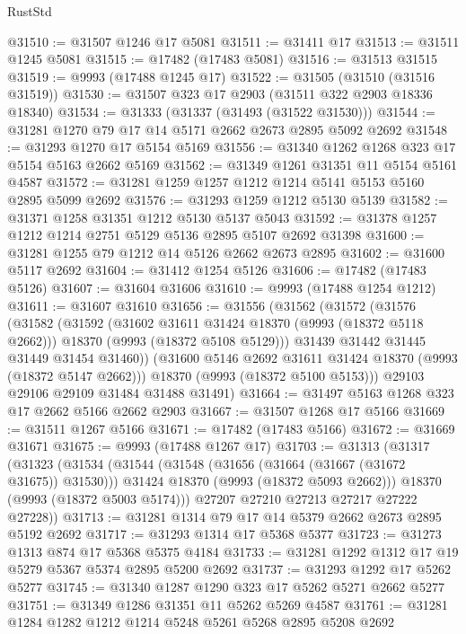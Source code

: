 \begin{lexlean}{RustStd}
\begin{coremodule}
@31510 := @31507 @1246 @17 @5081
@31511 := @31411 @17
@31513 := @31511 @1245 @5081
@31515 := @17482 (@17483 @5081)
@31516 := @31513 @31515
@31519 := @9993 (@17488 @1245 @17)
@31522 := @31505 (@31510 (@31516 @31519))
@31530 := @31507 @323 @17 @2903 (@31511 @322 @2903 @18336 @18340)
@31534 := @31333 (@31337 (@31493 (@31522 @31530)))
@31544 := @31281 @1270 @79 @17 @14 @5171 @2662 @2673 @2895 @5092 @2692
@31548 := @31293 @1270 @17 @5154 @5169
@31556 := @31340 @1262 @1268 @323 @17 @5154 @5163 @2662 @5169
@31562 := @31349 @1261 @31351 @11 @5154 @5161 @4587
@31572 := @31281 @1259 @1257 @1212 @1214 @5141 @5153 @5160 @2895 @5099 @2692
@31576 := @31293 @1259 @1212 @5130 @5139
@31582 := @31371 @1258 @31351 @1212 @5130 @5137 @5043
@31592 := @31378 @1257 @1212 @1214 @2751 @5129 @5136 @2895 @5107 @2692 @31398
@31600 := @31281 @1255 @79 @1212 @14 @5126 @2662 @2673 @2895
@31602 := @31600 @5117 @2692
@31604 := @31412 @1254 @5126
@31606 := @17482 (@17483 @5126)
@31607 := @31604 @31606
@31610 := @9993 (@17488 @1254 @1212)
@31611 := @31607 @31610
@31656 := @31556
    (@31562
      (@31572
        (@31576
          (@31582
            (@31592
              (@31602 @31611 @31424 @18370 (@9993 (@18372 @5118 @2662)))
              @18370
              (@9993 (@18372 @5108 @5129)))
            @31439
            @31442
            @31445
            @31449
            @31454
            @31460))
        (@31600 @5146 @2692 @31611 @31424 @18370 (@9993 (@18372 @5147 @2662)))
        @18370
        (@9993 (@18372 @5100 @5153)))
      @29103
      @29106
      @29109
      @31484
      @31488
      @31491)
@31664 := @31497 @5163 @1268 @323 @17 @2662 @5166 @2662 @2903
@31667 := @31507 @1268 @17 @5166
@31669 := @31511 @1267 @5166
@31671 := @17482 (@17483 @5166)
@31672 := @31669 @31671
@31675 := @9993 (@17488 @1267 @17)
@31703 := @31313
    (@31317
      (@31323
        (@31534
          (@31544
            (@31548 (@31656 (@31664 (@31667 (@31672 @31675)) @31530)))
            @31424
            @18370
            (@9993 (@18372 @5093 @2662)))
          @18370
          (@9993 (@18372 @5003 @5174)))
        @27207
        @27210
        @27213
        @27217
        @27222
        @27228))
@31713 := @31281 @1314 @79 @17 @14 @5379 @2662 @2673 @2895 @5192 @2692
@31717 := @31293 @1314 @17 @5368 @5377
@31723 := @31273 @1313 @874 @17 @5368 @5375 @4184
@31733 := @31281 @1292 @1312 @17 @19 @5279 @5367 @5374 @2895 @5200 @2692
@31737 := @31293 @1292 @17 @5262 @5277
@31745 := @31340 @1287 @1290 @323 @17 @5262 @5271 @2662 @5277
@31751 := @31349 @1286 @31351 @11 @5262 @5269 @4587
@31761 := @31281 @1284 @1282 @1212 @1214 @5248 @5261 @5268 @2895 @5208 @2692

\end{coremodule}
\end{lexlean}
